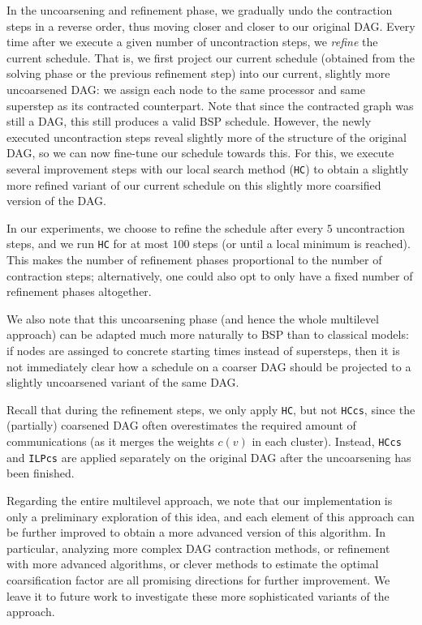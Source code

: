 \documentclass[sigconf,nonacm]{acmart}
\begin{document}
In the uncoarsening and refinement phase, we gradually undo the contraction steps in a reverse order, thus moving closer and closer to our original DAG. Every time after we execute a given number of uncontraction steps, we \textit{refine} the current schedule. That is, we first project our current schedule (obtained from the solving phase or the previous refinement step) into our current, slightly more uncoarsened DAG: we assign each node to the same processor and same superstep as its contracted counterpart. Note that since the contracted graph was still a DAG, this still produces a valid BSP schedule. However, the newly executed uncontraction steps reveal slightly more of the structure of the original DAG, so we can now fine-tune our schedule towards this. For this, we execute several improvement steps with our local search method (\texttt{HC}) to obtain a slightly more refined variant of our current schedule on this slightly more coarsified version of the DAG.

In our experiments, we choose to refine the schedule after every $5$ uncontraction steps, and we run \texttt{HC} for at most $100$ steps (or until a local minimum is reached). This makes the number of refinement phases proportional to the number of contraction steps; alternatively, one could also opt to only have a fixed number of refinement phases altogether.

We also note that this uncoarsening phase (and hence the whole multilevel approach) can be adapted much more naturally to BSP than to classical models: if nodes are assinged to concrete starting times instead of supersteps, then it is not immediately clear how a schedule on a coarser DAG should be projected to a slightly uncoarsened variant of the same DAG.

Recall that during the refinement steps, we only apply \texttt{HC}, but not \texttt{HCcs}, since the (partially) coarsened DAG often overestimates the required amount of communications (as it merges the weights $c(v)$ in each cluster). Instead, \texttt{HCcs} and \texttt{ILPcs} are applied separately on the original DAG after the uncoarsening has been finished.

Regarding the entire multilevel approach, we note that our implementation is only a preliminary exploration of this idea, and each element of this approach can be further improved to obtain a more advanced version of this algorithm. In particular, analyzing more complex DAG contraction methods, or refinement with more advanced algorithms, or clever methods to estimate the optimal coarsification factor are all promising directions for further improvement. We leave it to future work to investigate these more sophisticated variants of the approach.
\end{document}
